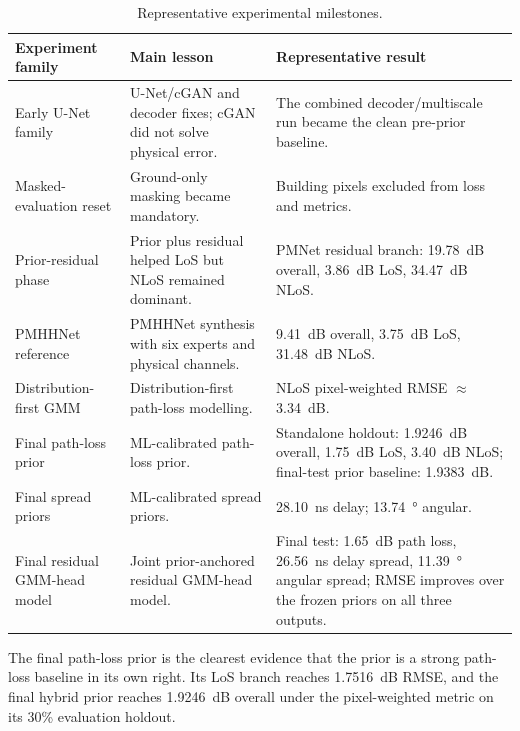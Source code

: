 \begin{table}[H]
\centering
\caption{Representative experimental milestones.}
\label{tab:timeline_results}
\begingroup
\footnotesize
\renewcommand{\arraystretch}{1.05}
\setlength{\tabcolsep}{3pt}
\begin{tabularx}{\textwidth}{>{\raggedright\arraybackslash}p{2.65cm}>{\raggedright\arraybackslash}X>{\raggedright\arraybackslash}X}
\toprule
Experiment family & Main lesson & Representative result \\
\midrule
Early U-Net family   & U-Net/cGAN and decoder fixes; cGAN did not solve physical error. & The combined decoder/multiscale run became the clean pre-prior baseline. \\
Masked-evaluation reset  & Ground-only masking became mandatory. & Building pixels excluded from loss and metrics. \\
Prior-residual phase  & Prior plus residual helped LoS but NLoS remained dominant. & PMNet residual branch: \SI{19.78}{dB} overall, \SI{3.86}{dB} LoS, \SI{34.47}{dB} NLoS. \\
PMHHNet reference      & PMHHNet synthesis with six experts and physical channels. & \SI{9.41}{dB} overall, \SI{3.75}{dB} LoS, \SI{31.48}{dB} NLoS. \\
Distribution-first GMM      & Distribution-first path-loss modelling. & NLoS pixel-weighted RMSE $\approx$\,\SI{3.34}{dB}. \\
Final path-loss prior      & ML-calibrated path-loss prior. & Standalone holdout: \SI{1.9246}{dB} overall, \SI{1.75}{dB} LoS, \SI{3.40}{dB} NLoS; final-test prior baseline: \SI{1.9383}{dB}. \\
Final spread priors      & ML-calibrated spread priors. & \SI{28.10}{ns} delay; \SI{13.74}{\degree} angular. \\
Final residual GMM-head model      & Joint prior-anchored residual GMM-head model. & Final test: \SI{1.65}{dB} path loss, \SI{26.56}{ns} delay spread, \SI{11.39}{\degree} angular spread; RMSE improves over the frozen priors on all three outputs. \\
\bottomrule
\end{tabularx}
\endgroup
\end{table}

The final path-loss prior is the clearest evidence that the prior is a strong
path-loss baseline in its own right. Its LoS branch reaches \SI{1.7516}{dB}
RMSE, and the final hybrid prior reaches \SI{1.9246}{dB} overall under the
pixel-weighted metric on its 30\% evaluation holdout.

